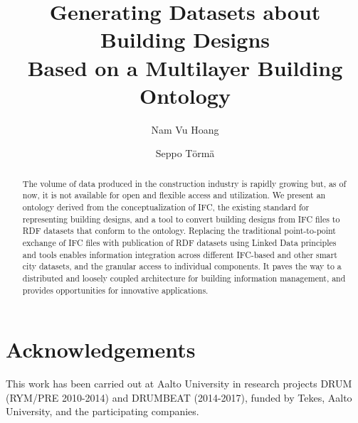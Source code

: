 \documentclass[envcountsame]{llncs}
\begin{document}
%
\frontmatter          %
%
\pagestyle{headings}  %
%


%
\title{Generating Datasets about Building Designs \\Based on a Multilayer Building Ontology}
%
%
\author{Nam Vu Hoang \and Seppo T\"orm\"a}
%
%

\maketitle              %

\begin{abstract}

The volume of data produced in the construction industry is rapidly growing but, as of now, it is not available for open and flexible access and utilization. We present an ontology derived from the conceptualization of IFC, the existing standard for representing building designs, and a tool to convert building designs from IFC files to RDF datasets that conform to the ontology. Replacing the traditional point-to-point exchange of IFC files with publication of RDF datasets using Linked Data principles and tools enables information integration across different IFC-based and other smart city datasets, and the granular access to individual components. It paves the way to a distributed and loosely coupled architecture for building information management, and provides opportunities for innovative applications. 


\end{abstract}






\section*{Acknowledgements}

This work has been carried out at Aalto University in research projects DRUM (RYM/PRE 2010-2014) and DRUMBEAT (2014-2017), funded by Tekes, Aalto University, and the participating companies. 




\clearpage
{} %
\renewcommand{\indexname}{Author Index}
\printindex
\clearpage
{} %
\renewcommand{\indexname}{Subject Index}
% 
\end{document}
